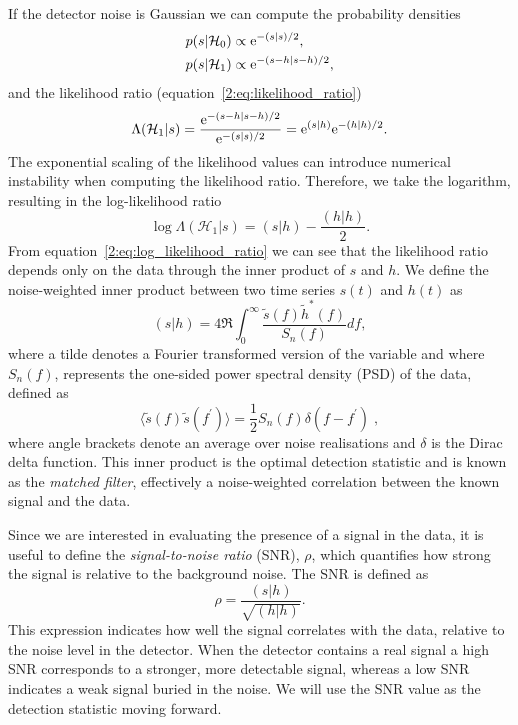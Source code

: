 If the detector noise is Gaussian we can compute the probability densities
%
\begin{align}
    p(s|\mathcal{H}_{0}) &\propto {\rm e}^{-(s|s)/2}, \\ 
    p(s|\mathcal{H}_{1}) &\propto {\rm e}^{-(s-h|s-h)/2},
\end{align}
%
and the likelihood ratio (equation~\ref{2:eq:likelihood_ratio})
%
\begin{equation}
    \Lambda(\mathcal{H}_{1}|s) = \frac{{\rm e}^{-(s-h|s-h)/2}}{{\rm e}^{-(s|s)/2}} = {\rm e}^{(s|h)}{\rm e}^{-(h|h)/2}.
\end{equation}
%
The exponential scaling of the likelihood values can introduce numerical instability when computing the likelihood ratio. Therefore, we take the logarithm, resulting in the log-likelihood ratio
%
\begin{equation}
    \log \Lambda(\mathcal{H}_{1}|s) = (s|h) - \frac{(h|h)}{2}.
    \label{2:eq:log_likelihood_ratio}
\end{equation}
%
From equation~\ref{2:eq:log_likelihood_ratio} we can see that the likelihood ratio depends only on the data through the inner product of $s$ and $h$. We define the noise-weighted inner product between two time series $s(t)$ and $h(t)$ as
%
\begin{equation}
  (s | h) = 4 \Re \int^{\infty}_{0} \frac{\tilde{s}(f) \tilde{h}^*(f)}{S_n(f)} df,
  \label{2:eqn:inner_product}
\end{equation}
%
where a tilde denotes a Fourier transformed version of the variable and where $S_n(f)$, represents the one-sided power spectral density (PSD) of the data, defined as
%
\begin{equation}
  \langle \tilde{s}(f) \tilde{s}(f^\prime) \rangle = \frac{1}{2} S_n(f) \delta(f - f^\prime) \;,
  \label{2:eqn:psd}
\end{equation}
%
where angle brackets denote an average over noise realisations and $\delta$ is the Dirac delta function. This inner product is the optimal detection statistic and is known as the \textit{matched filter}, effectively a noise-weighted correlation between the known signal and the data.

Since we are interested in evaluating the presence of a signal in the data, it is useful to define the \textit{signal-to-noise ratio} (SNR), \( \rho \), which quantifies how strong the signal is relative to the background noise. The SNR is defined as~\cite{FINDCHIRP:2012}
%
\begin{equation}
    \rho = \frac{(s|h)}{\sqrt{(h|h)}}.
    \label{2:eq:snr}
\end{equation}
%
This expression indicates how well the signal correlates with the data, relative to the noise level in the detector. When the detector contains a real signal a high SNR corresponds to a stronger, more detectable signal, whereas a low SNR indicates a weak signal buried in the noise. We will use the SNR value as the detection statistic moving forward.

